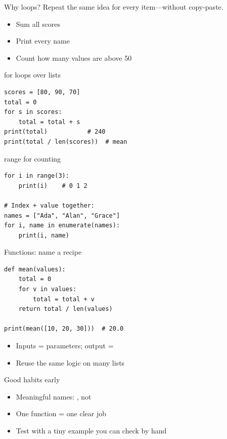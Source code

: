\documentclass[aspectratio=169,11pt]{beamer}
\begin{document}
    \begin{frame}{Why loops?}
        Repeat the same idea for every item---without copy-paste.
        \vspace{0.4em}
        \begin{itemize}
            \item Sum all scores
            \item Print every name
            \item Count how many values are above 50
        \end{itemize}
    \end{frame}

    \begin{frame}[fragile]{for loops over lists}
        \begin{lstlisting}
scores = [80, 90, 70]
total = 0
for s in scores:
    total = total + s
print(total)           # 240
print(total / len(scores))  # mean
        \end{lstlisting}
    \end{frame}

    \begin{frame}[fragile]{range for counting}
        \begin{lstlisting}
for i in range(3):
    print(i)    # 0 1 2

# Index + value together:
names = ["Ada", "Alan", "Grace"]
for i, name in enumerate(names):
    print(i, name)
        \end{lstlisting}
    \end{frame}

    \begin{frame}[fragile]{Functions: name a recipe}
        \begin{lstlisting}
def mean(values):
    total = 0
    for v in values:
        total = total + v
    return total / len(values)

print(mean([10, 20, 30]))  # 20.0
        \end{lstlisting}
        \vspace{0.3em}
        \begin{itemize}
            \item Inputs = parameters; output = 
            \item Reuse the same logic on many lists
        \end{itemize}
    \end{frame}

    \begin{frame}{Good habits early}
        \begin{itemize}
            \item Meaningful names: , not 
            \item One function = one clear job
            \item Test with a tiny example you can check by hand
        \end{itemize}
        \vspace{0.4em}
    \end{frame}
\end{document}
